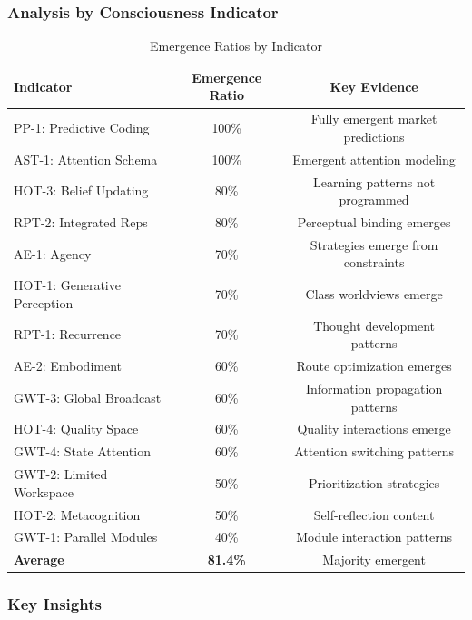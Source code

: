 \documentclass[12pt,a4paper]{article}
\begin{document}
\subsubsection{Analysis by Consciousness Indicator}

\begin{table}[H]
\centering
\caption{Emergence Ratios by Indicator}
\begin{tabular}{lcc}
\toprule
\textbf{Indicator} & \textbf{Emergence Ratio} & \textbf{Key Evidence} \\
\midrule
PP-1: Predictive Coding & 100\% & Fully emergent market predictions \\
AST-1: Attention Schema & 100\% & Emergent attention modeling \\
HOT-3: Belief Updating & 80\% & Learning patterns not programmed \\
RPT-2: Integrated Reps & 80\% & Perceptual binding emerges \\
AE-1: Agency & 70\% & Strategies emerge from constraints \\
HOT-1: Generative Perception & 70\% & Class worldviews emerge \\
RPT-1: Recurrence & 70\% & Thought development patterns \\
AE-2: Embodiment & 60\% & Route optimization emerges \\
GWT-3: Global Broadcast & 60\% & Information propagation patterns \\
HOT-4: Quality Space & 60\% & Quality interactions emerge \\
GWT-4: State Attention & 60\% & Attention switching patterns \\
GWT-2: Limited Workspace & 50\% & Prioritization strategies \\
HOT-2: Metacognition & 50\% & Self-reflection content \\
GWT-1: Parallel Modules & 40\% & Module interaction patterns \\
\midrule
\textbf{Average} & \textbf{81.4\%} & Majority emergent \\
\bottomrule
\end{tabular}
\end{table}

\subsubsection{Key Insights}
\end{document}
